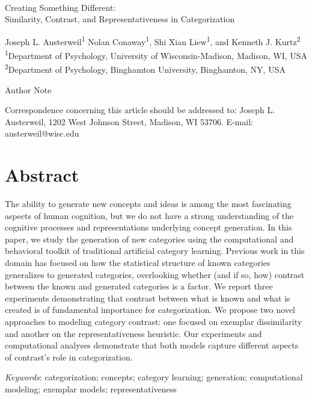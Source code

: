 \documentclass[12pt]{article}
\begin{document}
\begin{center}
\hfill
\\[1in]

Creating Something Different: \\
Similarity, Contrast, and Representativeness in Categorization


\vfill
Joseph L. Austerweil\textsuperscript{1}
Nolan Conaway\textsuperscript{1}, 
Shi Xian Liew\textsuperscript{1},
and Kenneth J. Kurtz\textsuperscript{2}
\\[\baselineskip]
\textsuperscript{1}Department of Psychology, University of Wisconsin-Madison, Madison, WI, USA
\textsuperscript{2}Department of Psychology, Binghamton University, Binghamton, NY, USA
\\[1in]

\vfill

Author Note

Correspondence concerning this article should be addressed to: 
Joseph L. Austerweil, 1202 West Johnson Street, Madison, WI 53706.
E-mail: austerweil@wisc.edu

\end{center}
\clearpage


\doublespacing
\section*{Abstract}
The ability to generate new concepts and ideas is among the most fascinating
aspects of human cognition, but we do not have a strong understanding of the
cognitive processes and representations underlying concept generation. In this
paper, we study the generation of new categories using the computational and
behavioral toolkit of traditional artificial category learning. Previous work in
this domain has focused on how the statistical structure of known categories
generalizes to generated categories, overlooking whether (and if so, how)
contrast between the known and generated categories is a factor. We report three
experiments demonstrating that contrast between what is known and what is
created is of fundamental importance for categorization. We propose two novel
approaches to modeling category contrast: one focused on exemplar dissimilarity
and another on the representativeness heuristic. Our experiments and
computational analyses demonstrate that both models capture different aspects of
contrast's role in categorization.

\setlength\parindent{0.5in}
{\em Keywords}: categorization; concepts; category learning; generation;
computational modeling; exemplar models; representativeness
\clearpage
\end{document}

